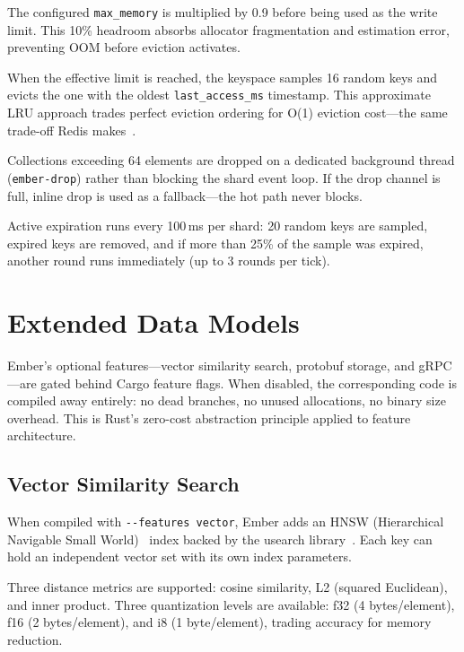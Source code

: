 \documentclass[conference]{IEEEtran}
\begin{document}
The configured \texttt{max\_memory} is multiplied by 0.9 before
being used as the write limit. This 10\% headroom absorbs allocator
fragmentation and estimation error, preventing OOM before eviction
activates.

When the effective limit is reached, the keyspace samples 16 random
keys and evicts the one with the oldest \texttt{last\_access\_ms}
timestamp. This approximate LRU approach trades perfect eviction
ordering for O(1) eviction cost---the same trade-off Redis
makes~\cite{redis-lru}.

Collections exceeding 64 elements are dropped on a dedicated
background thread (\texttt{ember-drop}) rather than blocking the
shard event loop. If the drop channel is full, inline drop is used
as a fallback---the hot path never blocks.

Active expiration runs every 100\,ms per shard: 20 random keys are
sampled, expired keys are removed, and if more than 25\% of the sample
was expired, another round runs immediately (up to 3 rounds per tick).


\section{Extended Data Models}
\label{sec:extended}

Ember's optional features---vector similarity search, protobuf
storage, and gRPC---are gated behind Cargo feature flags. When
disabled, the corresponding code is compiled away entirely: no dead
branches, no unused allocations, no binary size overhead. This is
Rust's zero-cost abstraction principle applied to feature
architecture.

\subsection{Vector Similarity Search}

When compiled with \texttt{-{}-features vector}, Ember adds an HNSW
(Hierarchical Navigable Small World)~\cite{hnsw} index backed by the
usearch library~\cite{usearch}. Each key can hold an independent
vector set with its own index parameters.

Three distance metrics are supported: cosine similarity, L2 (squared
Euclidean), and inner product. Three quantization levels are
available: f32 (4 bytes/element), f16 (2 bytes/element), and i8
(1 byte/element), trading accuracy for memory reduction.
\end{document}
